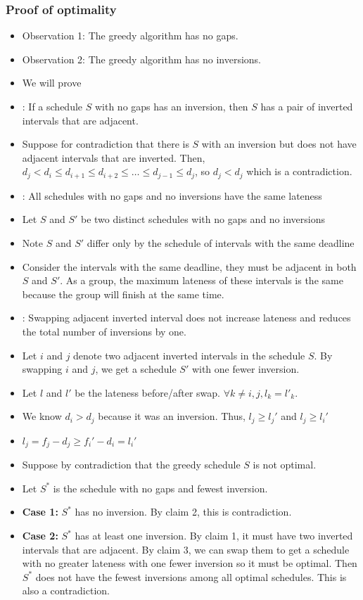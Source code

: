 \documentclass[a4paper,12pt]{article}
\begin{document}
\subsubsection{Proof of optimality}
\begin{itemize}
    \item Observation 1: The greedy algorithm has no gaps.
    \item Observation 2: The greedy algorithm has no inversions.
    \item We will prove
    \item {}: If a schedule $S$ with no gaps has an inversion, then $S$ has a pair of inverted intervals that are adjacent.
    \item Suppose for contradiction that there is $S$ with an inversion but does not have adjacent intervals that are inverted. Then, $d_j<d_i\leq d_{i+1}\leq d_{i+2}\leq\dots\leq d_{j-1}\leq d_j$, so $d_j<d_j$ which is a contradiction.
    \item {}: All schedules with no gaps and no inversions have the same lateness
    \item Let $S$ and $S'$ be two distinct schedules with no gaps and no inversions
    \item Note $S$ and $S'$ differ only by the schedule of intervals with the same deadline
    \item Consider the intervals with the same deadline, they must be adjacent in both $S$ and $S'$. As a group, the maximum lateness of these intervals is the same because the group will finish at the same time.
    \item {}: Swapping adjacent inverted interval does not increase lateness and reduces the total number of inversions by one.
    \item Let $i$ and $j$ denote two adjacent inverted intervals in the schedule $S$. By swapping $i$ and $j$, we get a schedule $S'$ with one fewer inversion.
    \item Let $l$ and $l'$ be the lateness before/after swap. $\forall k\neq i,j, l_k=l'_k$.
    \item We know $d_i>d_j$ because it was an inversion. Thus, $l_j\geq l_j'$ and $l_j\geq l_i'$
    \item $l_j=f_j-d_j\geq f_i'-d_i=l_i'$
    \item Suppose by contradiction that the greedy schedule $S$ is not optimal.
    \item Let $S^*$ is the schedule with no gaps and fewest inversion.
    \item \textbf{Case 1:} $S^*$ has no inversion. By claim 2, this is contradiction.
    \item \textbf{Case 2:} $S^*$ has at least one inversion. By claim 1, it must have two inverted intervals that are adjacent. By claim 3, we can swap them to get a schedule with no greater lateness with one fewer inversion so it must be optimal. Then $S^*$ does not have the fewest inversions among all optimal schedules. This is also a contradiction.
\end{itemize}
\end{document}
